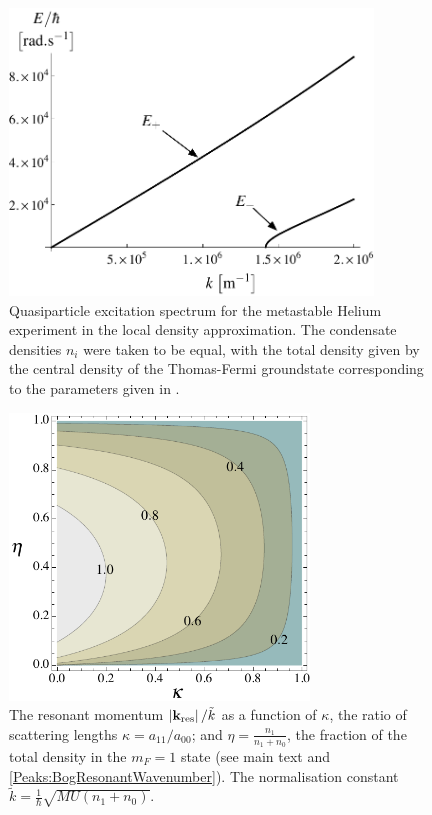 \begin{figure}[tbp]
    \centering
    \includegraphics[height=3in]{QuasiparticleSpectrum}
    \caption{Quasiparticle excitation spectrum for the metastable Helium experiment in the local density approximation. The condensate densities $n_i$ were taken to be equal, with the total density given by the central density of the Thomas-Fermi groundstate corresponding to the parameters given in . }
    \label{Peaks:QuasiparticleSpectrum}
\end{figure}


\begin{figure}[tbp]
    \centering
        \includegraphics[height=3in]{ResonantMomentum}
    \caption{The resonant momentum $\left|\mathbf{k}_\text{res}\right|/\tilde{k}$ as a function of $\kappa$, the ratio of scattering lengths $\kappa = a_{11}/a_{00}$; and $\displaystyle \eta = \frac{n_1}{n_1+n_0}$, the fraction of the total density in the $m_F=1$ state (see main text and \eqref{Peaks:BogResonantWavenumber}). The normalisation constant $\displaystyle\tilde{k}=  \frac{1}{\hbar}\sqrt{MU(n_1 + n_0)}$. }
    \label{Peaks:ResonantMomentum}
\end{figure}



